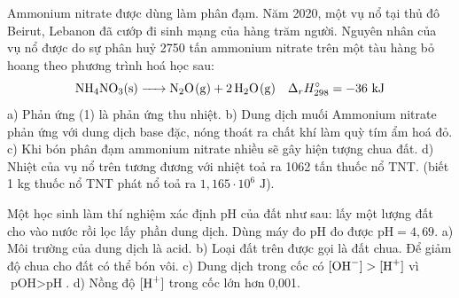 \documentclass[12pt,a4paper]{article}
\begin{document}
\begin{ex}
Ammonium nitrate được dùng làm phân đạm. Năm 2020, một vụ nổ tại thủ đô Beirut, Lebanon đã cướp đi sinh mạng của hàng trăm người. Nguyên nhân của vụ nổ được do sự phân huỷ 2750 tấn ammonium nitrate trên một tàu hàng bỏ hoang theo phương trình hoá học sau:
\[ \ce{NH4NO3(s) -> N2O(g) + 2H2O(g)} \quad \Delta_r H_{298}^\circ = -36\text{ kJ} \]
\choiceTF
{a) Phản ứng (1) là phản ứng thu nhiệt.}
{b) Dung dịch muối Ammonium nitrate phản ứng với dung dịch base đặc, nóng thoát ra chất khí làm quỳ tím ẩm hoá đỏ.}
{\True c) Khi bón phân đạm ammonium nitrate nhiều sẽ gây hiện tượng chua đất.}
{\True d) Nhiệt của vụ nổ trên tương đương với nhiệt toả ra 1062 tấn thuốc nổ TNT. (biết 1 kg thuốc nổ TNT phát nổ toả ra $1{,}165 \cdot 10^6\text{ J}$).}
\end{ex}

\begin{ex}
Một học sinh làm thí nghiệm xác định pH của đất như sau: lấy một lượng đất cho vào nước rồi lọc lấy phần dung dịch. Dùng máy đo pH đo được $\text{pH} = 4{,}69$.
\choiceTF
{\True a) Môi trường của dung dịch là acid.}
{\True b) Loại đất trên được gọi là đất chua. Để giảm độ chua cho đất có thể bón vôi.}
{c) Dung dịch trong cốc có $[\ce{OH-}] > [\ce{H+}]$ vì $\text{pOH} > \text{pH}$.}
{d) Nồng độ $[\ce{H+}]$ trong cốc lớn hơn 0,001.}
\end{ex}
\end{document}

